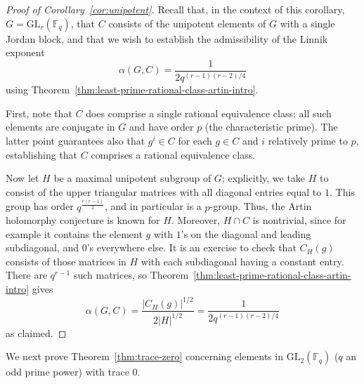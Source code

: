 \documentclass[12pt]{amsart}
\theoremstyle{definition} \newtheorem{definition}[theorem]{Definition}
\theoremstyle{example} \newtheorem{example}[theorem]{Example}
\theoremstyle{remark} \newtheorem{remark}{Remark}[theorem]
\numberwithin{equation}{section}
\numberwithin{theorem}{section}
\begin{document}
	\begin{proof}[Proof of Corollary~\ref{cor:unipotent}]
		Recall that, in the context of this corollary, $G = \mathrm{GL}_r(\mathbb{F}_q)$, that $C$ consists of the unipotent elements of $G$ with a single Jordan block, and that we wish to establish the admissibility of the Linnik exponent
			\[
				\alpha(G,C) = \frac{1}{2q^{(r-1)(r-2)/4}}
			\]
		using Theorem~\ref{thm:least-prime-rational-class-artin-intro}.
		
		First, note that $C$ does comprise a single rational equivalence class: all such elements are conjugate in $G$ and have order $p$ (the characteristic prime).  The latter point guarantees also that $g^i \in C$ for each $g \in C$ and $i$ relatively prime to $p$, establishing that $C$ comprises a rational equivalence class.
		
		Now let $H$ be a maximal unipotent subgroup of $G$; explicitly, we take $H$ to consist of the upper triangular matrices with all diagonal entries equal to $1$.  This group has order $q^{\frac{r(r-1)}{2}}$, and in particular is a $p$-group.  Thus, the Artin holomorphy conjecture is known for $H$.  Moreover, $H \cap C$ is nontrivial, since for example it contains the element $g$ with $1$'s on the diagonal and leading subdiagonal, and $0$'s everywhere else.  It is an exercise to check that $C_H(g)$ consists of those matrices in $H$ with each subdiagonal having a constant entry.  There are $q^{r-1}$ such matrices, so Theorem~\ref{thm:least-prime-rational-class-artin-intro} gives
			\[
				\alpha(G,C)
					= \frac{|C_H(g)|^{1/2}}{2|H|^{1/2}}
					= \frac{1}{2q^{(r-1)(r-2)/4}}
			\]
		as claimed.
	\end{proof}
	
	We next prove Theorem~\ref{thm:trace-zero} concerning elements in $\mathrm{GL}_2(\mathbb{F}_q)$ ($q$ an odd prime power) with trace $0$.
	
\end{document}
